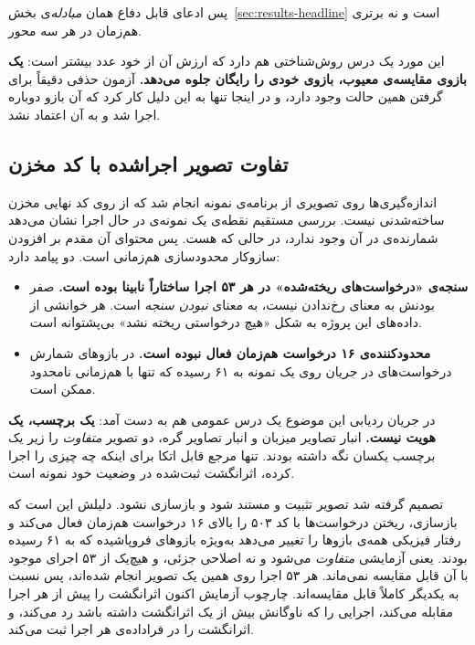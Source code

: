 پس ادعای قابل دفاع همان \emph{مبادله}‌ی بخش~\ref{sec:results-headline} است و نه برتری هم‌زمان
در هر سه محور.

این مورد یک درس روش‌شناختی هم دارد که ارزش آن از خود عدد بیشتر است:
\textbf{یک بازوی مقایسه‌ی معیوب، بازوی خودی را رایگان جلوه می‌دهد.} آزمون حذفی دقیقاً برای
گرفتن همین حالت وجود دارد، و در اینجا تنها به این دلیل کار کرد که آن بازو دوباره اجرا شد و
به آن اعتماد نشد.

\subsection{تفاوت تصویر اجراشده با کد مخزن}
\label{sec:results-image}

اندازه‌گیری‌ها روی تصویری از برنامه‌ی نمونه انجام شد که از روی کد نهایی مخزن ساخته‌شدنی نیست.
بررسی مستقیم نقطه‌ی  یک نمونه‌ی در حال اجرا نشان می‌دهد شمارنده‌ی
 در آن وجود ندارد، در حالی که
 هست. پس محتوای آن مقدم بر افزودن سازوکار محدودسازی هم‌زمانی
است. دو پیامد دارد:

\begin{itemize}
  \item \textbf{سنجه‌ی «درخواست‌های ریخته‌شده» در هر ۵۳ اجرا ساختاراً نابینا بوده است.} صفر
  بودنش به معنای رخ‌ندادن نیست، به معنای \emph{نبودن سنجه} است. هر خوانشی از داده‌های این
  پروژه به شکل «هیچ درخواستی ریخته نشد» بی‌پشتوانه است.
  \item \textbf{محدودکننده‌ی ۱۶ درخواست هم‌زمان فعال نبوده است.} در بازوهای
   شمارش درخواست‌های در جریان روی یک نمونه به ۶۱ رسیده که تنها با
  هم‌زمانی نامحدود ممکن است.
\end{itemize}

در جریان ردیابی این موضوع یک درس عمومی هم به دست آمد:
\textbf{یک برچسب، یک هویت نیست.} انبار تصاویر میزبان و انبار تصاویر گره، دو تصویر
\emph{متفاوت} را زیر یک برچسب یکسان نگه داشته بودند. تنها مرجع قابل اتکا برای اینکه
 چه چیزی را اجرا کرده، اثرانگشت ثبت‌شده در وضعیت خود نمونه است.

تصمیم گرفته شد تصویر تثبیت و مستند شود و بازسازی نشود. دلیلش این است که بازسازی، ریختن
درخواست‌ها با کد ۵۰۳ را بالای ۱۶ درخواست هم‌زمان فعال می‌کند و رفتار فیزیکی همه‌ی بازوها را
تغییر می‌دهد \mdash{} به‌ویژه بازوهای فروپاشیده که به ۶۱ رسیده بودند. یعنی آزمایشی \emph{متفاوت}
می‌شود و نه اصلاحی جزئی، و هیچ‌یک از ۵۳ اجرای موجود با آن قابل مقایسه نمی‌ماند. هر ۵۳ اجرا
روی همین یک تصویر انجام شده‌اند، پس نسبت به یکدیگر کاملاً قابل مقایسه‌اند. چارچوب آزمایش اکنون
اثرانگشت را پیش از هر اجرا مقابله می‌کند، اجرایی را که ناوگانش بیش از یک اثرانگشت داشته باشد
رد می‌کند، و اثرانگشت را در فراداده‌ی هر اجرا ثبت می‌کند.

